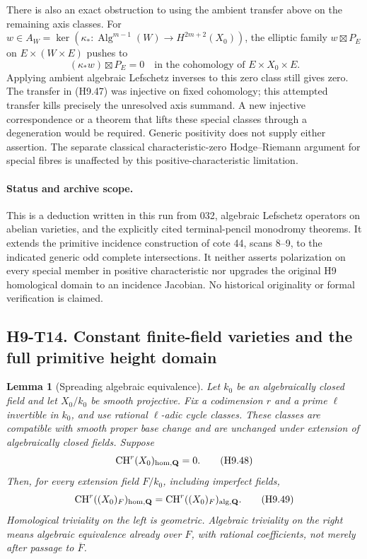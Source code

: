 \documentclass[11pt,a4paper]{article}
\newtheorem{lemma}[theorem]{Lemma}
\begin{document}
There is also an exact obstruction to using the ambient transfer
above on the remaining axis classes. For
$w\in A_W=\ker(\kappa_*:\operatorname{Alg}^{m-1}(W)
\to H^{2m+2}(X_0))$, the elliptic family $w\boxtimes P_E$
on $E\times(W\times E)$ pushes to
\[
 (\kappa_*w)\boxtimes P_E=0
       \quad\text{in the cohomology of }E\times X_0\times E.
\]
Applying ambient algebraic Lefschetz inverses to this zero class
still gives zero. The transfer in (H9.47) was injective on fixed
cohomology; this attempted transfer kills precisely the unresolved
axis summand. A new injective correspondence or a theorem that lifts
these special classes through a degeneration would be required.
Generic positivity does not supply either assertion. The separate
classical characteristic-zero Hodge--Riemann argument for special
fibres is unaffected by this positive-characteristic limitation.

\paragraph{Status and archive scope.}
This is a deduction written in this run from 032, algebraic Lefschetz
operators on abelian varieties, and the explicitly cited terminal-pencil
monodromy theorems. It extends the primitive incidence construction of
cote 44, scans 8--9, to the indicated generic odd complete intersections.
It neither asserts polarization on every special member in positive
characteristic nor upgrades the original H9 homological domain to an
incidence Jacobian. No historical originality or formal verification
is claimed.



\subsection*{H9-T14. Constant finite-field varieties and the full primitive height domain}

\begin{lemma}[Spreading algebraic equivalence]\label{h9:spread}
Let $k_0$ be an algebraically closed field and let $X_0/k_0$ be
smooth projective. Fix a codimension $r$ and a prime $\ell$ invertible
in $k_0$, and use rational $\ell$-adic cycle classes. These classes are
compatible with smooth proper base change and are unchanged under
extension of algebraically closed fields.
Suppose
\[
 \operatorname{CH}^r(X_0)_{\rm hom,\mathbf Q}=0.
                                                               \tag{H9.48}
\]
Then, for every extension field $F/k_0$, including imperfect fields,
\[
 \operatorname{CH}^r((X_0)_F)_{\rm hom,\mathbf Q}
       =\operatorname{CH}^r((X_0)_F)_{\rm alg,\mathbf Q}.       \tag{H9.49}
\]
Homological triviality on the left is geometric. Algebraic triviality
on the right means algebraic equivalence already over $F$, with
rational coefficients, not merely after passage to $\overline F$.
\end{lemma}
\end{document}

